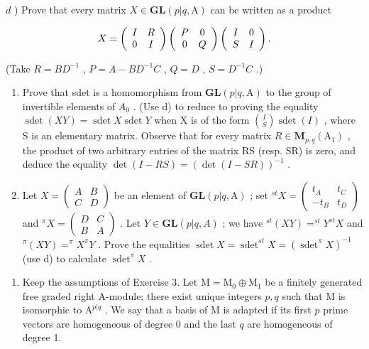 \(d\) ) Prove that every matrix \(X\in \mathbf{GL}(p|q,\mathrm{A})\) can be written as a product

\[
X = \left( \begin{array}{c c} I & R \\ 0 & I \end{array} \right) \left( \begin{array}{c c} P & 0 \\ 0 & Q \end{array} \right) \left( \begin{array}{c c} I & 0 \\ S & I \end{array} \right).
\]

(Take \(R = BD^{-1}\) , \(P = A - BD^{-1}C\) , \(Q = D\) , \(S = D^{-1}C\) .)

\begin{enumerate}
\def\labelenumi{\alph{enumi})}
\setcounter{enumi}{4}
\tightlist
\item
  Prove that sdet is a homomorphism from \(\mathbf{GL}(p|q,\mathrm{A})\) to the group of invertible elements of \(A_{0}\) . (Use d) to reduce to proving the equality \(\operatorname{sdet}(XY)=\operatorname{sdet}X\operatorname{sdet}Y\) when X is of the form \(\binom{I}{S}\operatorname{sdet}(I)\) , where S is an elementary matrix. Observe that for every matrix \(R\in\mathbf{M}_{p,q}(\mathrm{A}_{1})\) , the product of two arbitrary entries of the matrix RS (resp. SR) is zero, and deduce the equality \(\det(I-RS)=(\det(I-SR))^{-1}\) .
\item
  Let \(X = \begin{pmatrix} A & B \\ C & D \end{pmatrix}\) be an element of \(\mathbf{GL}(p|q,\mathrm{A})\) ; set \(^{st}X = \begin{pmatrix} t_{A} & t_{C} \\ -t_{B} & t_{D} \end{pmatrix}\) and \(^{\pi}X = \begin{pmatrix} D & C \\ B & A \end{pmatrix}\) . Let \(Y \in \mathbf{GL}(p|q, A)\) ; we have \(^{st}(XY) = ^{st}Y^{st}X\) and \(^{\pi}(XY) = ^{\pi}X^{\pi}Y\) . Prove the equalities \(\operatorname{sdet}X = \operatorname{sdet}^{st}X = (\operatorname{sdet}^{\pi}X)^{-1}\) (use d) to calculate \(\operatorname{sdet}^{\pi}X\) .
\end{enumerate}

\begin{enumerate}
\def\labelenumi{\arabic{enumi})}
\setcounter{enumi}{3}
\tightlist
\item
  Keep the assumptions of Exercise 3. Let \(\mathrm{M} = \mathrm{M}_0 \oplus \mathrm{M}_1\) be a finitely generated free graded right A-module; there exist unique integers \(p, q\) such that \(\mathrm{M}\) is isomorphic to \(\mathrm{A}^{p|q}\) . We say that a basis of \(\mathrm{M}\) is adapted if its first \(p\) prime vectors are homogeneous of degree 0 and the last \(q\) are homogeneous of degree 1.
\end{enumerate}

